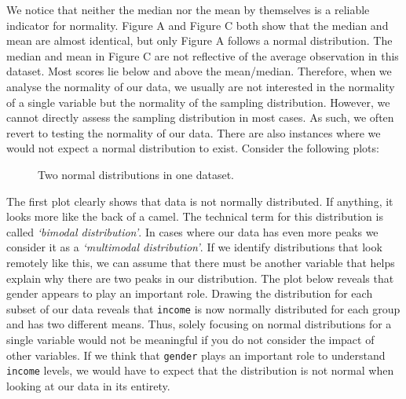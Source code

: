 \documentclass[
  letterpaper,
  DIV=11,
  numbers=noendperiod]{scrreprt}
\begin{document}
We notice that neither the median nor the mean by themselves is a
reliable indicator for normality. Figure A and Figure C both show that
the median and mean are almost identical, but only Figure A follows a
normal distribution. The median and mean in Figure C are not reflective
of the average observation in this dataset. Most scores lie below and
above the mean/median. Therefore, when we analyse the normality of our
data, we usually are not interested in the normality of a single
variable but the normality of the sampling distribution. However, we
cannot directly assess the sampling distribution in most cases. As such,
we often revert to testing the normality of our data. There are also
instances where we would not expect a normal distribution to exist.
Consider the following plots:

\begin{figure}


\caption{\label{fig-two-normalities-groups}Two normal distributions in
one dataset.}

\end{figure}%

The first plot clearly shows that data is not normally distributed. If
anything, it looks more like the back of a camel. The technical term for
this distribution is called \emph{`bimodal distribution'}. In cases
where our data has even more peaks we consider it as a \emph{`multimodal
distribution'}. If we identify distributions that look remotely like
this, we can assume that there must be another variable that helps
explain why there are two peaks in our distribution. The plot below
reveals that gender appears to play an important role. Drawing the
distribution for each subset of our data reveals that \texttt{income} is
now normally distributed for each group and has two different means.
Thus, solely focusing on normal distributions for a single variable
would not be meaningful if you do not consider the impact of other
variables. If we think that \texttt{gender} plays an important role to
understand \texttt{income} levels, we would have to expect that the
distribution is not normal when looking at our data in its entirety.
\end{document}
